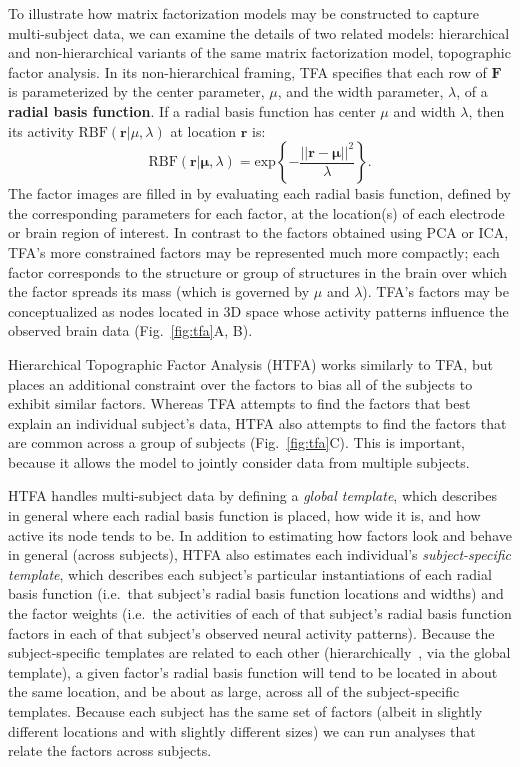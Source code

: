 \documentclass[runningheads]{llncs}
\begin{document}
To illustrate how matrix factorization models may be constructed to
capture multi-subject data, we can examine the details of two related
models: hierarchical and non-hierarchical variants of the same matrix
factorization model, topographic factor analysis.  In its
non-hierarchical framing, TFA specifies that each row of $\mathbf{F}$
is parameterized by the center parameter, $\mu$, and the width
parameter, $\lambda$, of a \textbf{radial basis function}.  If a
radial basis function has center $\mu$ and width $\lambda$, then its
activity $\mathrm{RBF}(\mathbf{r}|\mu,\lambda)$ at location
$\mathbf{r}$ is:
\[
  \mathrm{RBF}(\mathbf{r}|\mathbf{\mu},\lambda) =
  \mathrm{exp}\left\{ -\frac{||\mathbf{r} -
   \mathbf{\mu}||^2}{\lambda} \right\}.
\]
The factor images are filled in by evaluating each radial basis
function, defined by the corresponding parameters for each factor, at
the location(s) of each electrode or brain region of interest.  In
contrast to the factors obtained using PCA or ICA, TFA's more
constrained factors may be represented much more compactly; each
factor corresponds to the structure or group of structures in the
brain over which the factor spreads its mass (which is governed by
$\mu$ and $\lambda$).  TFA's factors may be conceptualized as nodes
located in 3D space whose activity patterns influence the observed
brain data (Fig.~\ref{fig:tfa}A, B).

Hierarchical Topographic Factor Analysis (HTFA) works similarly to
TFA, but places an additional constraint over the factors to bias all
of the subjects to exhibit similar factors.  Whereas TFA attempts to
find the factors that best explain an individual subject's data, HTFA
also attempts to find the factors that are common across a group of
subjects (Fig.~\ref{fig:tfa}C).  This is important, because it allows
the model to jointly consider data from multiple subjects.

HTFA handles multi-subject data by defining a \textit{global
  template}, which describes in general where each radial basis
function is placed, how wide it is, and how active its node tends to
be.  In addition to estimating how factors look and behave in general
(across subjects), HTFA also estimates each individual's
\textit{subject-specific template}, which describes each subject's
particular instantiations of each radial basis function (i.e.\ that
subject's radial basis function locations and widths) and the factor
weights (i.e.\ the activities of each of that subject's radial basis
function factors in each of that subject's observed neural activity
patterns).  Because the subject-specific templates are related to each
other (hierarchically~\cite{GelmHill07}, via the global template), a
given factor's radial basis function will tend to be located in about
the same location, and be about as large, across all of the
subject-specific templates.  Because each subject has the same set of
factors (albeit in slightly different locations and with slightly
different sizes) we can run analyses that relate the factors across
subjects.
\end{document}

